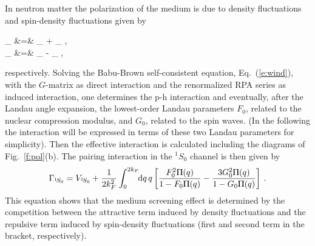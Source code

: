 \documentclass[runningheads]{svmult}
\newcommand{\greeksym}[1]{{\usefont{U}{psy}{m}{n}#1}}
\newcommand{\uPi}{\mbox{\greeksym{P}}}
\newcommand{\be}{\begin{equation}}
\newcommand{\ee}{\end{equation}}
\newcommand{\bsa}{\begin{subeqnarray}}
\newcommand{\esa}{\end{subeqnarray}}
\def\kv{\vec{k}}
\def\ss{^1\!S_0}
\begin{document}
In neutron matter the polarization of the medium is due to density fluctuations
and spin-density fluctuations given by
\bsa
 \delta\rho_{\kv} &=& 
 \delta\rho_{{\kv}\uparrow} + \delta\rho_{{\kv}\downarrow} \:, 
\\
 \delta\rho_{\kv} &=& 
 \delta\rho_{{\kv}\uparrow} - \delta\rho_{{\kv}\downarrow} \:,
\esa
respectively.
Solving the Babu-Brown self-consistent equation, Eq.~(\ref{e:wind}), with 
the $G$-matrix as direct interaction and the renormalized RPA series as 
induced interaction, one determines the p-h interaction and 
eventually, after the Landau angle expansion, the lowest-order Landau 
parameters $F_0$, related to the nuclear compression modulus, and $G_0$,
related to the spin waves.
(In the following the interaction will be expressed
in terms of these two Landau parameters for simplicity). 
Then the effective interaction is calculated including the 
diagrams of Fig.~\ref{f:pol}(b).
The pairing interaction in the $\ss$ channel is then given by    
\be
 \Gamma_{\ss} = V_{\ss} + {\frac{1}{2k_F^2}} \int_0^{2k_F} \!\!\D q \,q 
 \left[ {F_0^2 \uPi(q)\over{1-F_0 \uPi(q)}} -
 {3 G_0^2 \uPi(q)\over{1-G_0 \uPi(q)}} \right]  \:.    
\label{e:pollan}
\ee
This equation shows that the medium screening effect is determined by the 
competition between the attractive term induced by density fluctuations
and the repulsive term induced by spin-density fluctuations (first and 
second term in the bracket, respectively).
\end{document}
